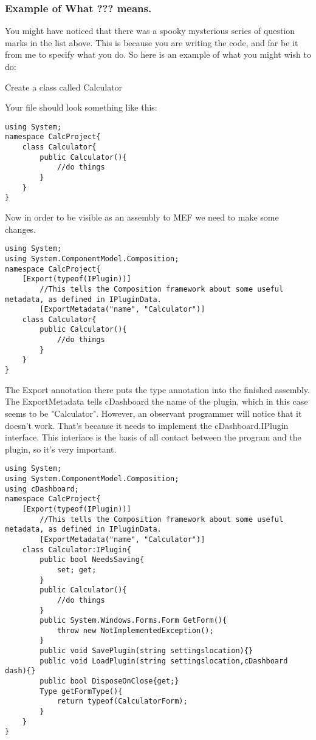\documentclass{article}
\begin{document}
\subsubsection{Example of What ??? means.}

You might have noticed that there was a spooky mysterious series of question marks in the list above. This is because you are writing the code, and far be it from me to specify what you do. So here is an example of what you might wish to do:

 Create a class called Calculator


Your file should look something like this:
\begin{lstlisting}[label=Calculator.cs]
using System;
namespace CalcProject{
	class Calculator{
		public Calculator(){
			//do things
		}
	}
}
\end{lstlisting}

Now in order to be visible as an assembly to MEF we need to make some changes.

\begin{lstlisting}[label=Calculator.cs]
using System;
using System.ComponentModel.Composition;
namespace CalcProject{
	[Export(typeof(IPlugin))]
    	//This tells the Composition framework about some useful metadata, as defined in IPluginData.
    	[ExportMetadata("name", "Calculator")]
	class Calculator{
		public Calculator(){
			//do things
		}
	}
}
\end{lstlisting}

The Export annotation there puts the type annotation into the finished assembly. The ExportMetadata tells cDashboard the name of the plugin, which in this case seems to be "Calculator".
 However, an observant programmer will notice that it doesn't work. That's because it needs to implement the cDashboard.IPlugin interface. This interface is the basis of all contact between the program and the plugin, so it's very important.
 
\begin{lstlisting}[label=Calculator.cs]
using System;
using System.ComponentModel.Composition;
using cDashboard;
namespace CalcProject{
	[Export(typeof(IPlugin))]
    	//This tells the Composition framework about some useful metadata, as defined in IPluginData.
    	[ExportMetadata("name", "Calculator")]
	class Calculator:IPlugin{
		public bool NeedsSaving{
			set; get;
		}
		public Calculator(){
			//do things
		}
		public System.Windows.Forms.Form GetForm(){
			throw new NotImplementedException();
		}
		public void SavePlugin(string settingslocation){}
		public void LoadPlugin(string settingslocation,cDashboard dash){}
		public bool DisposeOnClose{get;}
		Type getFormType(){
			return typeof(CalculatorForm);
		}
	}
}
\end{lstlisting}
 
\end{document}
